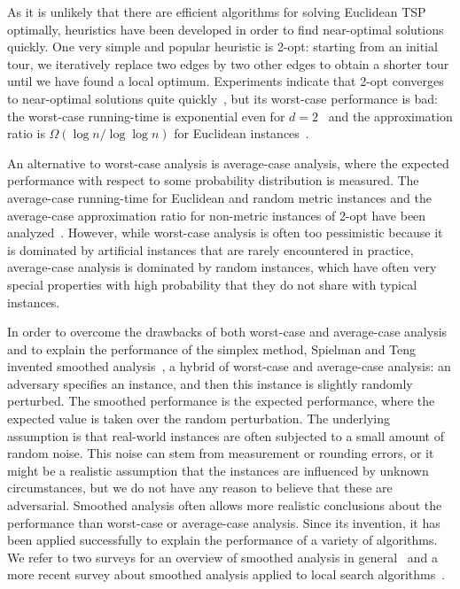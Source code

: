 \documentclass[11pt,DIV=12,a4paper]{scrartcl}
\begin{document}
As it is unlikely that there are efficient algorithms for solving Euclidean TSP optimally,
heuristics have been developed in order to find near-optimal solutions quickly. One very simple and popular heuristic
is 2-opt: starting from an initial tour, we iteratively replace two edges by two other edges to obtain a shorter
tour until we have found a local optimum.
Experiments indicate that 2-opt converges to near-optimal solutions quite
quickly~\cite{JohnsonMcGeoch:CaseTSP:1997,JohnsonMcGeoch:ExperimentalSTSP:2002},
but its worst-case performance is bad: the worst-case running-time is
exponential even for $d=2$~\cite{EnglertEA:2Opt:2014}
and the approximation ratio is
$\Omega(\log n/\log \log n)$ for Euclidean instances~\cite{ChandraEA:OldOpt:1999}.

An alternative to worst-case analysis is average-case analysis,
where the expected performance with respect to some probability distribution is measured.
The average-case running-time for Euclidean and random metric instances and the average-case approximation
ratio for non-metric instances of 2-opt have been analyzed~\cite{Kern:Switching:1989,EngelsManthey:2Opt:2009,ChandraEA:OldOpt:1999,BringmannEA:RSP:2013}.
However, while worst-case analysis is often too pessimistic because it is dominated by artificial instances
that are rarely encountered in practice, average-case analysis is dominated by random instances, which have
often very special properties with high probability that they do not share with typical instances.

In order to overcome the drawbacks of both worst-case and average-case analysis
and to explain the performance
of the simplex method, Spielman and Teng invented smoothed analysis~\cite{SpielmanTeng:SmoothedAnalysisWhy:2004},
a hybrid of worst-case and average-case analysis:
an adversary specifies an instance, and then this instance is slightly randomly perturbed. The smoothed performance
is the expected performance, where the expected value is taken over the random perturbation.
The underlying assumption is that real-world instances
are often subjected to a small amount of random noise. This noise can stem from measurement or rounding errors,
or it might be a realistic assumption that the instances are influenced by unknown circumstances, but we do not have
any reason to believe that these are adversarial.
Smoothed analysis often allows more realistic conclusions about the
performance than worst-case or average-case analysis.
Since its invention, it has been applied successfully
to explain the performance of a variety of
algorithms.
We refer to two surveys for an overview of smoothed analysis in general~\cite{SpielmanTeng:CACM:2009,MantheyRoeglin:SmoothedSurvey:2011} and a more recent survey about
smoothed analysis applied to local
search algorithms~\cite{Manthey:ABWCBook}.
\end{document}
